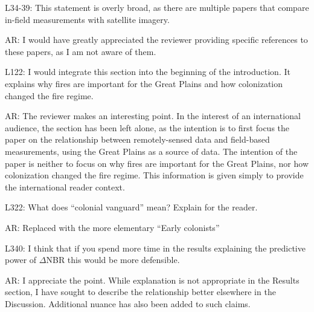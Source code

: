 \documentclass[parskip=half, american]{scrartcl}
\newcommand{\AR}[1]
	{\color{PineGreen}AR: #1\color{black} \par }
\begin{document}
L34-39: This statement is overly broad, as there are multiple papers that compare in-field measurements with satellite imagery.

\AR{I would have greatly appreciated the reviewer providing specific references to these papers, as I am not aware of them. }

L122: I would integrate this section into the beginning of the introduction. It explains why fires are important for the Great Plains and how colonization changed the fire regime. 

\AR{The reviewer makes an interesting point. 
	In the interest of an international audience, the section has been left alone, as the intention is to first focus the paper on the relationship between remotely-sensed data and field-based measurements, using the Great Plains as a source of data. 
	The intention of the paper is neither to focus on why fires are important for the Great Plains, nor how colonization changed the fire regime. 
	This information is given simply to provide the international reader context. }

L322: What does ``colonial vanguard'' mean? Explain for the reader.

\AR{Replaced with the more elementary ``Early colonists''} 

L340: I think that if you spend more time in the results explaining the predictive power of $\Delta$NBR this would be more defensible. 

\AR{I appreciate the point. While explanation is not appropriate in the Results section, I have sought to describe the relationship better elsewhere in the Discussion. Additional nuance has also been added to such claims. 
 }
\end{document}
